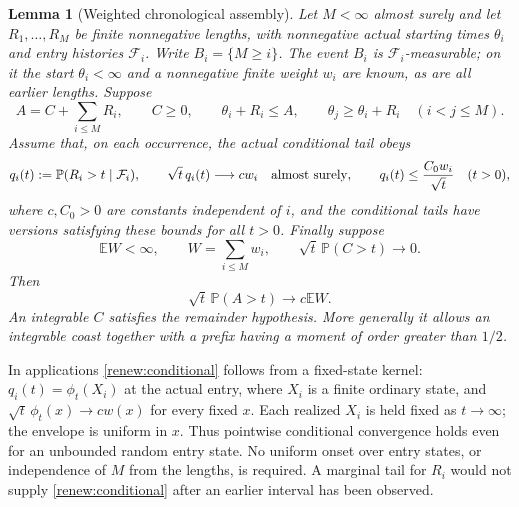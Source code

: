 \documentclass[11pt]{amsart}
\newtheorem{lemma}[theorem]{Lemma}
\theoremstyle{definition}
\theoremstyle{remark}
\newcommand{\E}{\mathbb E}
\newcommand{\PP}{\mathbb P}
\begin{document}
\begin{lemma}[Weighted chronological assembly]\label{renew:weighted}
Let $M<\infty$ almost surely and let $R_1,\ldots,R_M$ be finite
nonnegative lengths, with nonnegative actual starting times $\theta_i$ and entry
histories $\mathcal F_i$. Write $B_i=\{M\ge i\}$. The event $B_i$ is
$\mathcal F_i$-measurable; on it the start $\theta_i<\infty$ and a
nonnegative finite weight $w_i$ are known, as are all earlier lengths.
Suppose
\[
 A=C+\sum_{i\le M}R_i,\qquad C\ge0,\qquad
 \theta_i+R_i\le A,\qquad
 \theta_j\ge\theta_i+R_i\quad(i<j\le M).
\]
Assume that, on each occurrence, the actual conditional tail obeys
\begin{equation}\label{renew:conditional}
 q_i(t):=\PP(R_i>t\mid\mathcal F_i),\qquad
 \sqrt t\,q_i(t)\longrightarrow c w_i\quad\hbox{almost surely},
 \qquad q_i(t)\le\frac{C_0w_i}{\sqrt t}\quad(t>0),
\end{equation}
where $c,C_0>0$ are constants independent of $i$, and the conditional
tails have versions satisfying these bounds for all $t>0$. Finally suppose
\begin{equation}\label{renew:budget}
 \E W<\infty,\qquad W=\sum_{i\le M}w_i,\qquad
 \sqrt t\,\PP(C>t)\longrightarrow0.
\end{equation}
Then
\begin{equation}\label{renew:tail}
 \sqrt t\,\PP(A>t)\longrightarrow c\E W.
\end{equation}
An integrable $C$ satisfies the remainder hypothesis. More generally it
allows an integrable coast together with a prefix having a moment of
order greater than $1/2$.
\end{lemma}

In applications \eqref{renew:conditional} follows from a fixed-state
kernel: $q_i(t)=\phi_t(X_i)$ at the actual entry, where $X_i$ is a finite
ordinary state, and $\sqrt t\,\phi_t(x)\to c w(x)$ for every fixed $x$.
Each realized $X_i$ is held fixed as $t\to\infty$; the envelope is uniform
in $x$. Thus pointwise conditional convergence holds even for an
unbounded random entry state. No uniform onset over entry states, or
independence of $M$ from the lengths, is required. A marginal tail for
$R_i$ would not supply \eqref{renew:conditional} after an earlier
interval has been observed.
\end{document}
